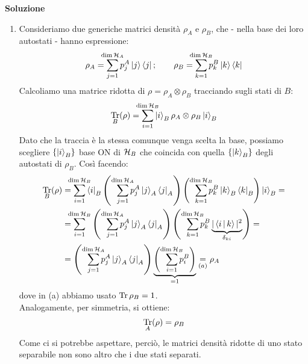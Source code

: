 \documentclass[../../InformazioneQuantistica.tex]{subfiles}
\begin{document}
\textbf{Soluzione}
\begin{enumerate}
\item Consideriamo due generiche matrici densità $\rho_A$ e $\rho_B$, che - nella base dei loro autostati - hanno espressione:
\begin{align*}
    \rho_A = \smashoperator{\sum_{j=1}^{\op{dim}\hs_A}} p_j^A \ket{j}\bra{j}; \qquad \rho_B = \smashoperator{\sum_{k=1}^{\op{dim}\hs_B}} p_k^B \ket{k}\bra{k}
\end{align*}
Calcoliamo una matrice ridotta di $\rho= \rho_A \otimes \rho_B$ tracciando sugli stati di $B$:
\begin{align*}
    \underset{B}{\op{Tr}}(\rho) = \smashoperator{\sum_{i=1}^{\op{dim}\hs_B}} \ket{i}_B \rho_A \otimes \rho_B \ket{i}_B
\end{align*}
Dato che la traccia è la stessa comunque venga scelta la base, possiamo scegliere $\{\Ket{i}_B\}$ base ON di $\mathcal{H}_B$ che coincida con quella $\{\Ket{k}_B\}$ degli autostati di $\rho_B$. Così facendo:
\begin{align*}
    \underset{B}{\op{Tr}}(\rho) &= \smashoperator{\sum_{i=1}^{\op{dim}\hs_B}}
\bra{i}_B \left(\smashoperator[r]{\sum_{j=1}^{\op{dim}\hs_A}} p_j^A \ket{j}_A\bra{j}_A\right)\left( \smashoperator[r]{\sum_{k=1}^{\op{dim}\hs_B}} p_k^B \ket{k}_B\bra{k}_B\right)\ket{i}_B =\\
&= \smashoperator[l]{\sum_{i=1}^{\op{dim}\hs_B}} \left(\smashoperator[r]{\sum_{j=1}^{\op{dim}\hs_A}} p_j^A \ket{j}_A\bra{j}_A\right) \left( \smashoperator[r]{\sum_{k=1}^{\op{dim}\hs_B}} p_k^B \underbrace{|\braket{i|k}|^2}_{\delta_{ki}} \right) =
\\
&= \left( \smashoperator[r]{\sum_{j=1}^{\op{dim}\hs_A}} p_j^A \ket{j}_A\bra{j}_A\right) \underbrace{\left( \smashoperator[r]{\sum_{i=1}^{\op{dim}\hs_B}} p_i^B \right)}_{=1} \underset{(a)}{=} \rho_A
\end{align*}
dove in (a) abbiamo usato $\operatorname{Tr} \rho_B = 1$.\\
Analogamente, per simmetria, si ottiene:
\begin{align*}
    \underset{A}{\operatorname{Tr}}(\rho) = \rho_B
\end{align*}
Come ci si potrebbe aspettare, perciò, le matrici densità ridotte di uno stato separabile non sono altro che i due stati separati. 


\end{enumerate}
\end{document}
